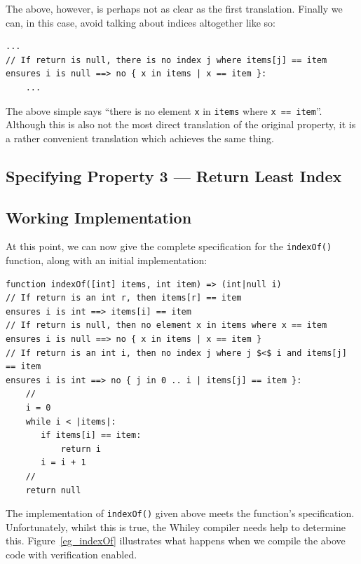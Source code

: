 The above, however, is perhaps not as clear as the first translation.
Finally we can, in this case, avoid talking about indices altogether
like so:

\begin{lstlisting}
...
// If return is null, there is no index j where items[j] == item
ensures i is null ==> no { x in items | x == item }:
    ...
\end{lstlisting}

The above simple says ``there is no element \lstinline{x} in
\lstinline{items} where \lstinline{x == item}''.  Although this is
also not the most direct translation of the original property, it is a
rather convenient translation which achieves the same thing.

\subsection{Specifying Property 3 --- Return Least Index}
\subsection{Working Implementation}

At this point, we can now give the complete specification for the
\lstinline{indexOf()} function, along with an initial implementation:

\begin{lstlisting}
function indexOf([int] items, int item) => (int|null i)
// If return is an int r, then items[r] == item
ensures i is int ==> items[i] == item
// If return is null, then no element x in items where x == item
ensures i is null ==> no { x in items | x == item }
// If return is an int i, then no index j where j $<$ i and items[j] == item
ensures i is int ==> no { j in 0 .. i | items[j] == item }:
    //
    i = 0
    while i < |items|:
       if items[i] == item:
           return i 
       i = i + 1
    //
    return null
\end{lstlisting}

The implementation of \lstinline{indexOf()} given above meets the
function's specification.  Unfortunately, whilst this is true, the
Whiley compiler needs help to determine this.  Figure~\ref{eg_indexOf}
illustrates what happens when we compile the above code with
verification enabled.

